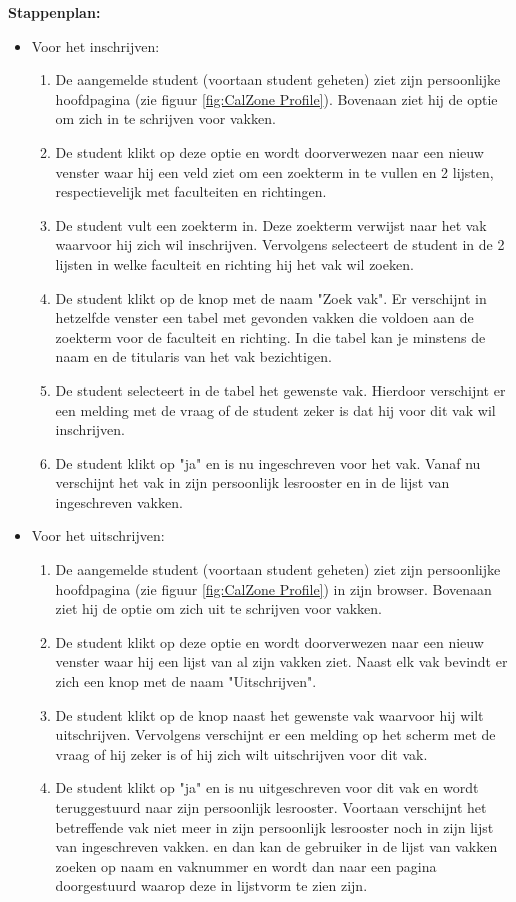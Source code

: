 \textbf{Stappenplan:}
\begin{itemize}
\item Voor het inschrijven:
	\begin{enumerate}
	\item De aangemelde student (voortaan student geheten) ziet zijn persoonlijke hoofdpagina (zie figuur \ref{fig:CalZone Profile}). Bovenaan ziet hij de optie om zich in te schrijven voor vakken.
	\item De student klikt op deze optie en wordt doorverwezen naar een nieuw venster waar hij een veld ziet om een zoekterm in te vullen en 2 lijsten, respectievelijk met faculteiten en richtingen.
	\item De student vult een zoekterm in. Deze zoekterm verwijst naar het vak waarvoor hij zich wil inschrijven. Vervolgens selecteert de student in de 2 lijsten in welke faculteit en richting hij het vak wil zoeken.
	\item De student klikt op de knop met de naam "Zoek vak". Er verschijnt in hetzelfde venster een tabel met gevonden vakken die voldoen aan de zoekterm voor de faculteit en richting. In die tabel kan je minstens de naam en de titularis van het vak bezichtigen.
	\item De student selecteert in de tabel het gewenste vak. Hierdoor verschijnt er een melding met de vraag of de student zeker is dat hij voor dit vak wil inschrijven.
	\item De student klikt op "ja" en is nu ingeschreven voor het vak. Vanaf nu verschijnt het vak in zijn persoonlijk lesrooster en in de lijst van ingeschreven vakken.
	\end{enumerate}
	
\item Voor het uitschrijven:
	\begin{enumerate}
	\item De aangemelde student (voortaan student geheten) ziet zijn persoonlijke hoofdpagina (zie figuur \ref{fig:CalZone Profile}) in zijn browser. Bovenaan ziet hij de optie om zich uit te schrijven voor vakken.
	\item De student klikt op deze optie en wordt doorverwezen naar een nieuw venster waar hij een lijst van al zijn vakken ziet. Naast elk vak bevindt er zich een knop met de naam "Uitschrijven".
	\item De student klikt op de knop naast het gewenste vak waarvoor hij wilt uitschrijven. Vervolgens verschijnt er een melding op het scherm met de vraag of hij zeker is of hij zich wilt uitschrijven voor dit vak.
	\item De student klikt op "ja" en is nu uitgeschreven voor dit vak en wordt teruggestuurd naar zijn persoonlijk lesrooster. Voortaan verschijnt het betreffende vak niet meer in zijn persoonlijk lesrooster noch in zijn lijst van ingeschreven vakken. en dan kan de gebruiker in de lijst van vakken zoeken op naam en vaknummer en wordt dan naar een pagina doorgestuurd waarop deze in lijstvorm te zien zijn.
	\end{enumerate}
\end{itemize}

